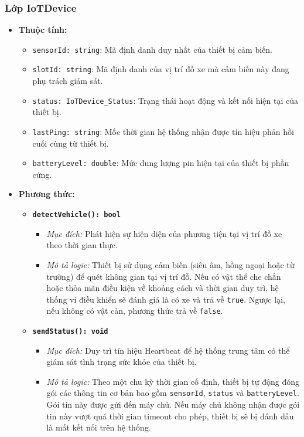 \subsubsection{Lớp IoTDevice}

\begin{itemize}
    \item \textbf{Thuộc tính:}
    \begin{itemize}
        \item \texttt{sensorId: string}: Mã định danh duy nhất của thiết bị cảm biến.
        \item \texttt{slotId: string}: Mã định danh của vị trí đỗ xe mà cảm biến này đang phụ trách giám sát.
        \item \texttt{status: IoTDevice\_Status}: Trạng thái hoạt động và kết nối hiện tại của thiết bị.
        \item \texttt{lastPing: string}: Mốc thời gian hệ thống nhận được tín hiệu phản hồi cuối cùng từ thiết bị.
        \item \texttt{batteryLevel: double}: Mức dung lượng pin hiện tại của thiết bị phần cứng.
    \end{itemize}
    
    \item \textbf{Phương thức:}
    \begin{itemize}
        \item \textbf{\texttt{detectVehicle(): bool}}
        \begin{itemize}
            \item \textit{Mục đích:} Phát hiện sự hiện diện của phương tiện tại vị trí đỗ xe theo thời gian thực.
            \item \textit{Mô tả logic:} Thiết bị sử dụng cảm biến (siêu âm, hồng ngoại hoặc từ trường) để quét không gian tại vị trí đỗ. Nếu có vật thể che chắn hoặc thỏa mãn điều kiện về khoảng cách và thời gian duy trì, hệ thống vi điều khiển sẽ đánh giá là có xe và trả về \texttt{true}. Ngược lại, nếu không có vật cản, phương thức trả về \texttt{false}.
        \end{itemize}

        \item \textbf{\texttt{sendStatus(): void}}
        \begin{itemize}
            \item \textit{Mục đích:} Duy trì tín hiệu Heartbeat để hệ thống trung tâm có thể giám sát tình trạng sức khỏe của thiết bị.
            \item \textit{Mô tả logic:} Theo một chu kỳ thời gian cố định, thiết bị tự động đóng gói các thông tin cơ bản bao gồm \texttt{sensorId}, \texttt{status} và \texttt{batteryLevel}. Gói tin này được gửi đến máy chủ. Nếu máy chủ không nhận được gói tin này vượt quá thời gian timeout cho phép, thiết bị sẽ bị đánh dấu là mất kết nối trên hệ thống.
        \end{itemize}


\end{itemize}
\end{itemize}

